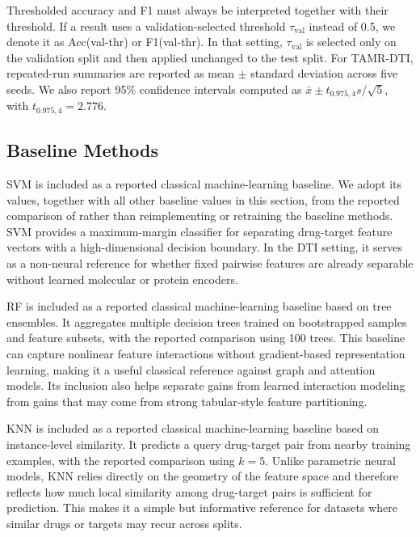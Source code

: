 Thresholded accuracy and F1 must always be interpreted together with their threshold. If a result uses a validation-selected threshold $\tau_{\mathrm{val}}$ instead of 0.5, we denote it as Acc(val-thr) or F1(val-thr). In that setting, $\tau_{\mathrm{val}}$ is selected only on the validation split and then applied unchanged to the test split. For TAMR-DTI, repeated-run summaries are reported as mean $\pm$ standard deviation across five seeds. We also report 95\% confidence intervals computed as $\bar{x} \pm t_{0.975,4}s/\sqrt{5}$, with $t_{0.975,4}=2.776$.

\subsection{Baseline Methods}

SVM \citep{cortes1995svm} is included as a reported classical machine-learning baseline. We adopt its values, together with all other baseline values in this section, from the reported comparison of \citet{ji2026ldmdti} rather than reimplementing or retraining the baseline methods. SVM provides a maximum-margin classifier for separating drug-target feature vectors with a high-dimensional decision boundary. In the DTI setting, it serves as a non-neural reference for whether fixed pairwise features are already separable without learned molecular or protein encoders.

RF \citep{breiman2001random} is included as a reported classical machine-learning baseline based on tree ensembles. It aggregates multiple decision trees trained on bootstrapped samples and feature subsets, with the reported comparison using 100 trees. This baseline can capture nonlinear feature interactions without gradient-based representation learning, making it a useful classical reference against graph and attention models. Its inclusion also helps separate gains from learned interaction modeling from gains that may come from strong tabular-style feature partitioning.

KNN \citep{guo2003knn} is included as a reported classical machine-learning baseline based on instance-level similarity. It predicts a query drug-target pair from nearby training examples, with the reported comparison using $k=5$. Unlike parametric neural models, KNN relies directly on the geometry of the feature space and therefore reflects how much local similarity among drug-target pairs is sufficient for prediction. This makes it a simple but informative reference for datasets where similar drugs or targets may recur across splits.

